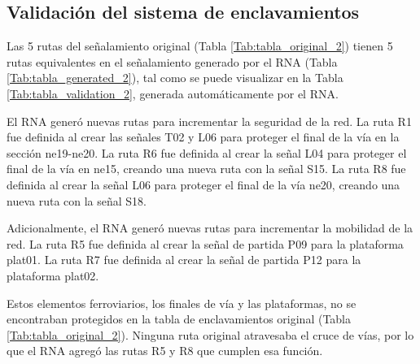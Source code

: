 \subsection{Validación del sistema de enclavamientos}

	Las 5 rutas del señalamiento original (Tabla \ref{Tab:tabla_original_2}) tienen 5 rutas equivalentes en el señalamiento generado por el RNA (Tabla \ref{Tab:tabla_generated_2}), tal como se puede visualizar en la Tabla \ref{Tab:tabla_validation_2}, generada automáticamente por el RNA.

    \begin{table}[H]
        {
        \caption{Equivalencias entre las rutas originales y las generadas por el RNA.}
        \label{Tab:tabla_validation_2}
        \centering
            \begin{center}
            \end{center}
        }    
    \end{table}
    
    El RNA generó nuevas rutas para incrementar la seguridad de la red. La ruta R1 fue definida al crear las señales T02 y L06 para proteger el final de la vía en la sección ne19-ne20. La ruta R6 fue definida al crear la señal L04 para proteger el final de la vía en ne15, creando una nueva ruta con la señal S15. La ruta R8 fue definida al crear la señal L06 para proteger el final de la vía ne20, creando una nueva ruta con la señal S18.
    
    Adicionalmente, el RNA generó nuevas rutas para incrementar la mobilidad de la red. La ruta R5 fue definida al crear la señal de partida P09 para la plataforma plat01. La ruta R7 fue definida al crear la señal de partida P12 para la plataforma plat02.
    
    Estos elementos ferroviarios, los finales de vía y las plataformas, no se encontraban protegidos en la tabla de enclavamientos original (Tabla \ref{Tab:tabla_original_2}). Ninguna ruta original atravesaba el cruce de vías, por lo que el RNA agregó las rutas R5 y R8 que cumplen esa función.